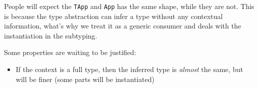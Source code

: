 \documentclass{article}
\begin{document}
People will expect the \texttt{TApp} and \texttt{App} has the same shape, while they are not. This is because the type abstraction can infer a type without any contextual information, what's why we treat it as a generic consumer and deals with the instantiation in the subtyping.

Some properties are waiting to be justified:

\begin{itemize}
	\item If the context is a full type, then the inferred type is \emph{almost} the same, but will be finer (some parts will be instantiated)
\end{itemize}

\begin{comment}
\subsection{Subtyping: $\boxed{\Gamma \vdash A <: \Sigma \dashv \Gamma' \rightsquigarrow A}$}

\begin{mathpar}
\inferrule*[lab=S-Int]
{ }
{\Gamma \vdash \mathtt{Int} <: \mathtt{Int} \dashv \Gamma \rightsquigarrow \mathtt{Int}}

\inferrule*[lab=S-Empty]
{FV_{ex}(\Gamma, A) = . \\ \Gamma \vdash A}
{\Gamma \vdash A <: \square \dashv \Gamma \rightsquigarrow A}

\inferrule*[lab=S-Ex-L]
{FV_{ex}(\Gamma, A) = . \\ \Gamma \vdash A}
{\Gamma \vdash \hat{a} <: A \dashv [A/\hat{a}]~\Gamma \rightsquigarrow A}

\inferrule*[lab=S-Ex-R]
{FV_{ex}(\Gamma, A) = . \\ \Gamma \vdash A}
{\Gamma \vdash A <: \hat{a} \dashv [A/\hat{a}]~\Gamma \rightsquigarrow A}

\inferrule*[lab=S-Arr]
{\Gamma \vdash C <: A \dashv \Gamma_1 \rightsquigarrow A' \\
 \Gamma_1 \vdash B <: D \dashv \Gamma_2 \rightsquigarrow D'}
{\Gamma \vdash A \rightarrow B <: C \rightarrow D \dashv \Gamma_2 \rightsquigarrow C \rightarrow D}

\inferrule*[lab=S-Hole-No-Ex]
{ FV_{ex}(\Gamma, A) = . \\
\Gamma \vdash A \Rightarrow e \Rightarrow C\\
 \Gamma \vdash B <: \Sigma \dashv \Gamma' \rightsquigarrow D}
{\Gamma \vdash A \rightarrow B <: \boxed{e} \leadsto \Sigma \dashv \Gamma' \rightsquigarrow A \rightarrow D}


\end{comment}
\end{document}

